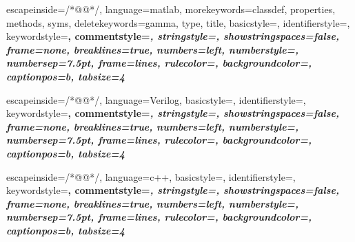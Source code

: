 

 {
	escapeinside={/*@}{@*/},
	language=matlab,
	morekeywords={classdef, properties, methods, syms},
	deletekeywords={gamma, type, title},
	basicstyle=\ttfamily \small \color{inlineBoxListingText},
	identifierstyle=\ttfamily \small \color{black},
	keywordstyle=\bfseries \color{keywordcolor},
	commentstyle=\itshape \color{commentcolor},
	stringstyle=\ttfamily \color{stringcolor},
	showstringspaces=false,
	frame=none,
	breaklines=true,
	numbers=left,
	numberstyle={\llabelput \scriptsize \ttfamily \color{numbercolor}},
	numbersep=7.5pt,
	frame=lines,
	rulecolor=\color{bordercolor},
	backgroundcolor=\color{backgroundcolor},
	captionpos=b,
	tabsize=4
}

 {
	escapeinside={/*@}{@*/},
	language=Verilog,
	basicstyle=\ttfamily \small,
	identifierstyle=\ttfamily \small \color{inlineBoxListingText},
	keywordstyle=\bfseries \color{keywordcolor},
	commentstyle=\itshape \color{commentcolor},
	stringstyle=\ttfamily \color{stringcolor},
	showstringspaces=false,
	frame=none,
	breaklines=true,
	numbers=left,
	numberstyle={\llabelput \scriptsize \ttfamily \color{numbercolor}},
	numbersep=7.5pt,
	frame=lines,
	rulecolor=\color{bordercolor},
	backgroundcolor=\color{backgroundcolor},
	captionpos=b,
	tabsize=4
}

 {
	escapeinside={/*@}{@*/},
	language=c++,
	basicstyle=\ttfamily \small \color{inlineBoxListingText},
	identifierstyle=\ttfamily \small \color{black},
	keywordstyle=\bfseries \color{keywordcolor},
	commentstyle=\itshape \color{commentcolor},
	stringstyle=\ttfamily \color{stringcolor},
	showstringspaces=false,
	frame=none,
	breaklines=true,
	numbers=left,
	numberstyle={\llabelput \scriptsize \ttfamily \color{numbercolor}},
	numbersep=7.5pt,
	frame=lines,
	rulecolor=\color{bordercolor},
	backgroundcolor=\color{backgroundcolor},
	captionpos=b,
	tabsize=4
}

\makeatletter
{}
\newlength{\llabelsep}

